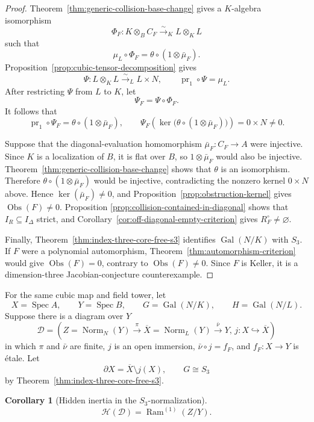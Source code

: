 \documentclass[11pt]{article}
\newtheorem{corollary}[theorem]{Corollary}
\theoremstyle{remark}
\theoremstyle{definition}
\DeclareMathOperator{\Spec}{Spec}
\DeclareMathOperator{\Gal}{Gal}
\DeclareMathOperator{\Ram}{Ram}
\DeclareMathOperator{\Norm}{Norm}
\newcommand{\Obs}{\operatorname{Obs}}
\begin{document}
\begin{proof}
Theorem~\ref{thm:generic-collision-base-change} gives a \(K\)-algebra
isomorphism
\[
  \Phi_F\colon K\otimes_BC_F\xrightarrow{\sim}_K L\otimes_KL
\]
such that
\[
  \mu_L\circ\Phi_F
  =
  \theta\circ(1\otimes\bar\mu_F).
\]
Proposition~\ref{prop:cubic-tensor-decomposition} gives
\[
  \Psi\colon L\otimes_KL\xrightarrow{\sim}_L L\times N,
  \qquad
  \operatorname{pr}_1\circ\Psi=\mu_L.
\]
After restricting \(\Psi\) from \(L\) to \(K\), let
\[
  \Psi_F=\Psi\circ\Phi_F.
\]
It follows that
\[
  \operatorname{pr}_1\circ\Psi_F
  =
  \theta\circ(1\otimes\bar\mu_F),
  \qquad
  \Psi_F\!\left(
    \ker\bigl(\theta\circ(1\otimes\bar\mu_F)\bigr)
  \right)
  =
  0\times N\neq0.
\]

Suppose that the diagonal-evaluation homomorphism
\(\bar\mu_F\colon C_F\to A\) were injective.  Since \(K\) is a
localization of \(B\), it is flat over
\(B\), so \(1\otimes\bar\mu_F\) would also be injective.
Theorem~\ref{thm:generic-collision-base-change} shows that \(\theta\)
is an isomorphism.  Therefore
\(\theta\circ(1\otimes\bar\mu_F)\) would be injective, contradicting
the nonzero kernel \(0\times N\) above.  Hence
\(\ker(\bar\mu_F)\neq0\), and
Proposition~\ref{prop:obstruction-kernel} gives
\(\Obs(F)\neq0\).  Proposition
\ref{prop:collision-contained-in-diagonal} shows that
\(I_R\subseteq I_\Delta\) strict, and
Corollary~\ref{cor:off-diagonal-empty-criterion} gives
\(R_F^\circ\neq\varnothing\).

Finally, Theorem~\ref{thm:index-three-core-free-s3} identifies
\(\Gal(N/K)\) with \(S_3\).  If \(F\) were a polynomial automorphism,
Theorem~\ref{thm:automorphism-criterion} would give
\(\Obs(F)=0\), contrary to \(\Obs(F)\neq0\).  Since \(F\) is Keller, it is
a dimension-three Jacobian-conjecture counterexample.
\end{proof}

For the same cubic map and field tower, let
\[
  X=\Spec A,
  \qquad
  Y=\Spec B,
  \qquad
  G=\Gal(N/K),
  \qquad
  H=\Gal(N/L).
\]
Suppose there is a diagram over \(Y\)
\[
  \mathcal D=
  \left(
    Z=\Norm_N(Y)\xrightarrow{\pi}
    \overline X=\Norm_L(Y)\xrightarrow{\bar\nu}Y,\,
    j\colon X\hookrightarrow\overline X
  \right)
\]
in which \(\pi\) and \(\bar\nu\) are finite, \(j\) is an open immersion,
\(\bar\nu\circ j=f_F\), and \(f_F\colon X\to Y\) is \'etale.  Let
\[
  \partial X=\overline X\setminus j(X),
  \qquad
  G\cong S_3
\]
by Theorem~\ref{thm:index-three-core-free-s3}.

\begin{corollary}[Hidden inertia in the \(S_3\)-normalization]
\label{cor:cubic-hidden-inertia}
\[
  \mathcal H(\mathcal D)=\Ram^{(1)}(Z/Y).
\]
\end{corollary}
\end{document}

